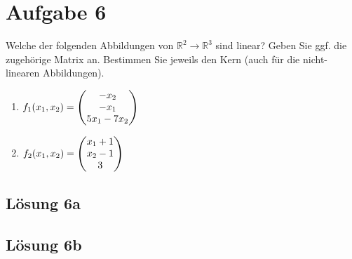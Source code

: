\documentclass[main.tex]{subfiles}
\begin{document}
\section{Aufgabe 6}
Welche der folgenden Abbildungen von $\mathbb{R}^2 \to \mathbb{R}^3$ sind linear? Geben Sie ggf. die zugehörige Matrix an.
Bestimmen Sie jeweils den Kern (auch für die nicht-linearen Abbildungen).

\begin{enumerate}
    \item $f_1(x_1, x_2) = \vektor{ -x_2 \\ -x_1 \\ 5x_1 - 7x_2 }$
    \item $f_2(x_1, x_2) = \vektor{ x_1 + 1 \\ x_2 - 1 \\ 3 }$
\end{enumerate}

\subsection{Lösung 6a}
\subsection{Lösung 6b}
\end{document}
